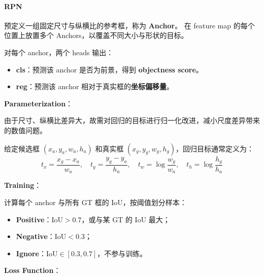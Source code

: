 \paragraph{RPN}\label{rpn}

预定义一组固定尺寸与纵横比的参考框，称为 \textbf{Anchor}。 在 feature
map 的每个位置上放置多个 Anchors，以覆盖不同大小与形状的目标。

对每个 anchor，两个 heads 输出：

\begin{itemize}
\tightlist
\item
  \textbf{cls}：预测该 anchor 是否为前景，得到 \textbf{objectness
  score}。
\item
  \textbf{reg}：预测该 anchor 相对于真实框的\textbf{坐标偏移量}。
\end{itemize}

\textbf{Parameterization}：

由于尺寸、纵横比差异大，故需对回归的目标进行归一化改进，减小尺度差异带来的数值问题。

给定候选框 \((x_a, y_a, w_a, h_a)\) 和真实框
\((x_g, y_g, w_g, h_g)\)，回归目标通常定义为： \[
t_x = \frac{x_g - x_a}{w_a},\quad
t_y = \frac{y_g - y_a}{h_a},\quad
t_w = \log\frac{w_g}{w_a},\quad
t_h = \log\frac{h_g}{h_a}
\]

\textbf{Training}：

计算每个 anchor 与所有 GT 框的 IoU，按阈值划分样本：

\begin{itemize}
\tightlist
\item
  \textbf{Positive}：\(\text{IoU} > 0.7\)，或与某 GT 的 IoU 最大；
\item
  \textbf{Negative}：\(\text{IoU} < 0.3\)；
\item
  \textbf{Ignore}：\(\text{IoU} \in [0.3, 0.7]\)，不参与训练。
\end{itemize}

\textbf{Loss Function}：

